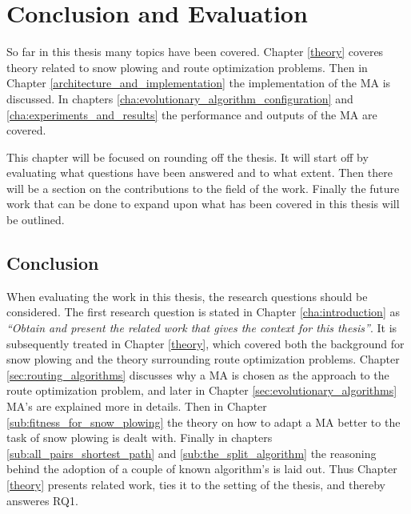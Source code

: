 \chapter{Conclusion and Evaluation}

So far in this thesis many topics have been covered. Chapter \ref{theory} coveres theory related to snow plowing and route optimization problems. Then in Chapter \ref{architecture_and_implementation} the implementation of the MA is discussed. In chapters \ref{cha:evolutionary_algorithm_configuration} and \ref{cha:experiments_and_results} the performance and outputs of the MA are covered.

This chapter will be focused on rounding off the thesis. It will start off by evaluating what questions have been answered and to what extent. Then there will be a section on the contributions to the field of the work. Finally the future work that can be done to expand upon what has been covered in this thesis will be outlined.

\section{Conclusion}

When evaluating the work in this thesis, the research questions should be considered. The first research question is stated in Chapter \ref{cha:introduction} as \emph{\enquote{Obtain and present the related work that gives the context for this thesis}}. It is subsequently treated in Chapter \ref{theory}, which covered both the background for snow plowing and the theory surrounding route optimization problems. Chapter \ref{sec:routing_algorithms} discusses why a MA is chosen as the approach to the route optimization problem, and later in Chapter \ref{sec:evolutionary_algorithms} MA's are explained more in details. Then in Chapter \ref{sub:fitness_for_snow_plowing} the theory on how to adapt a MA better to the task of snow plowing is dealt with. Finally in chapters \ref{sub:all_pairs_shortest_path} and \ref{sub:the_split_algorithm} the reasoning behind the adoption of a couple of known algorithm's is laid out. Thus Chapter \ref{theory} presents related work, ties it to the setting of the thesis, and thereby answeres RQ1.

